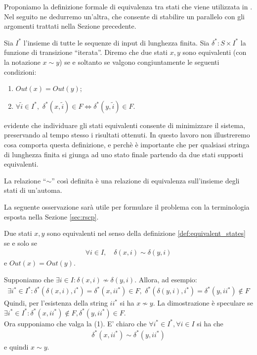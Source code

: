 Proponiamo la definizione formale di equivalenza tra stati che viene utilizzata in \cite{hopcroft}. Nel seguito ne dedurremo un'altra, che consente di stabilire un parallelo con gli argomenti trattati nella Sezione precedente.
\begin{definition}
    \label{def:equivalent_states}
    Sia $I^*$ l'insieme di tutte le sequenze di input di lunghezza finita. Sia $\delta^* : S \times I^*$ la funzione di transizione ``iterata''. Diremo che due stati $x,y$ sono equivalenti (con la notazione $x \sim y$) se e soltanto se valgono congiuntamente le seguenti condizioni:
    \begin{enumerate}
        \item $Out(x) = Out(y)$;
        \item $\forall \widetilde{i} \in I^*,\,\, \delta^*(x,\widetilde{i}) \in F \iff \delta^*(y,\widetilde{i}) \in F$.
    \end{enumerate}
\end{definition}
\accente evidente che individuare gli stati equivalenti consente di minimizzare il sistema, preservando al tempo stesso i risultati ottenuti. In questo lavoro non illustreremo cosa comporta questa definizione, e perchè è importante che per qualsiasi stringa di lunghezza finita si giunga ad uno stato finale partendo da due stati supposti equivalenti.
\begin{observation}
    La relazione ``$\sim$'' così definita è una relazione di equivalenza sull'insieme degli stati di un'automa.
\end{observation}
La seguente osservazione sarà utile per formulare il problema con la terminologia esposta nella Sezione \ref*{sec:rscp}.
\begin{observation}
    \label{obs:equivalent_states}
    Due stati $x,y$ sono equivalenti nel senso della definizione \ref*{def:equivalent_states} se e solo se
    \begin{gather}
        \forall i \in I, \quad \delta(x,i) \sim \delta(y,i)
    \end{gather}
    e $Out(x) = Out(y)$.
\end{observation}
\begin{proof2}
    Supponiamo che $\exists i \in I : \delta(x,i) \not\sim \delta(y,i)$. Allora, ad esempio:
    \begin{gather*}
        \exists i^* \in I^* : \delta^*(\delta(x,i),i^*) = \delta^*(x,ii^*) \in F, \,\, \delta^*(\delta(y,i),i^*) = \delta^*(y,ii^*) \notin F
    \end{gather*}
    Quindi, per l'esistenza della string $ii^*$ si ha $x \not\sim y$. La dimostrazione è speculare se $\exists i^* \in I^* : \delta^*(x,ii^*) \notin F, \delta^*(y,ii^*) \in F$.\\
    Ora supponiamo che valga la (1). E' chiaro che $\forall i^* \in I^*, \forall i \in I$ si ha che
    \begin{gather*}
        \delta^*(x,ii^*) \sim \delta^*(y,ii^*)
    \end{gather*}
    e quindi $x \sim y$.
\end{proof2}
